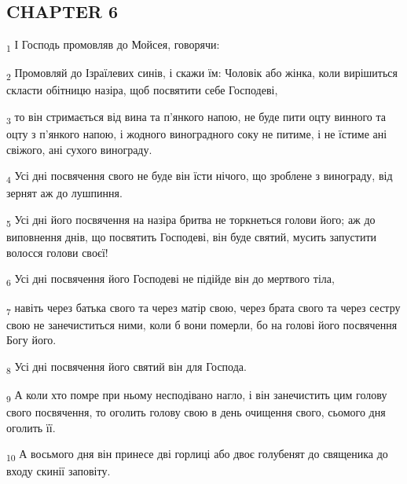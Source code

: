 \subsection{CHAPTER 6}
\begin{tcolorbox}
\textsubscript{1} І Господь промовляв до Мойсея, говорячи:
\end{tcolorbox}
\begin{tcolorbox}
\textsubscript{2} Промовляй до Ізраїлевих синів, і скажи їм: Чоловік або жінка, коли вирішиться скласти обітницю назіра, щоб посвятити себе Господеві,
\end{tcolorbox}
\begin{tcolorbox}
\textsubscript{3} то він стримається від вина та п'янкого напою, не буде пити оцту винного та оцту з п'янкого напою, і жодного виноградного соку не питиме, і не їстиме ані свіжого, ані сухого винограду.
\end{tcolorbox}
\begin{tcolorbox}
\textsubscript{4} Усі дні посвячення свого не буде він їсти нічого, що зроблене з винограду, від зернят аж до лушпиння.
\end{tcolorbox}
\begin{tcolorbox}
\textsubscript{5} Усі дні його посвячення на назіра бритва не торкнеться голови його; аж до виповнення днів, що посвятить Господеві, він буде святий, мусить запустити волосся голови своєї!
\end{tcolorbox}
\begin{tcolorbox}
\textsubscript{6} Усі дні посвячення його Господеві не підійде він до мертвого тіла,
\end{tcolorbox}
\begin{tcolorbox}
\textsubscript{7} навіть через батька свого та через матір свою, через брата свого та через сестру свою не занечиститься ними, коли б вони померли, бо на голові його посвячення Богу його.
\end{tcolorbox}
\begin{tcolorbox}
\textsubscript{8} Усі дні посвячення його святий він для Господа.
\end{tcolorbox}
\begin{tcolorbox}
\textsubscript{9} А коли хто помре при ньому несподівано нагло, і він занечистить цим голову свого посвячення, то оголить голову свою в день очищення свого, сьомого дня оголить її.
\end{tcolorbox}
\begin{tcolorbox}
\textsubscript{10} А восьмого дня він принесе дві горлиці або двоє голубенят до священика до входу скинії заповіту.
\end{tcolorbox}
